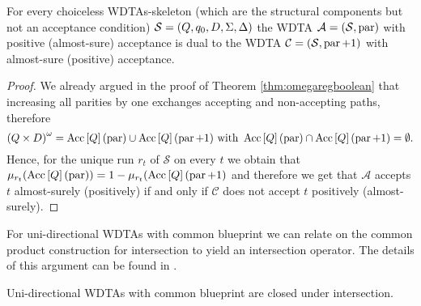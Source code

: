 \begin{proposition}
  For every choiceless \acp{WDTA}-skeleton (which are the structural components
  but not an acceptance condition) 
  $\mathcal{S} = \left(Q, q_{0}, D, \Sigma, \Delta\right)$ the
  \ac{WDTA} $\mathcal{A} = \left(\mathcal{S}, \operatorname{par}\right)$ with positive 
  (almost-sure) acceptance is dual to the \ac{WDTA} 
  $\mathcal{C} = \left(\mathcal{S}, \operatorname{par} + 1\right)$ with almost-sure (positive)
  acceptance.
\end{proposition}
\begin{proof}
  We already argued in the proof of Theorem \ref{thm:omegaregboolean} that 
  increasing all parities by one exchanges accepting and non-accepting paths,
  therefore
  \begin{equation*}
    \left(Q\times D\right)^{\omega} = 
      \operatorname{Acc}\left[Q\right](\operatorname{par})\cup\operatorname{Acc}\left[Q\right](\operatorname{par} + 1)
    \text{ with }
      \operatorname{Acc}\left[Q\right](\operatorname{par})\cap\operatorname{Acc}\left[Q\right](\operatorname{par} + 1) = \emptyset.
  \end{equation*}
  Hence, for the unique run $r_{t}$ of $\mathcal{S}$ on every $t$ we obtain 
  that $\mu_{r_{t}}(\operatorname{Acc}\left[Q\right](\operatorname{par})) = 
    1 - \mu_{r_{t}}(\operatorname{Acc}\left[Q\right](\operatorname{par} + 1)$ and therefore we get that
  $\mathcal{A}$ accepts $t$ almost-surely (positively) if and only if
  $\mathcal{C}$ does not accept $t$ positively (almost-surely).
\end{proof}
For uni-directional \acp{WDTA} with common blueprint we can relate on the 
common product construction for intersection to yield an intersection operator.
The details of this argument can be found in 
\cite[Proposition 14]{RandAutoInfTrees}.
\begin{proposition}
  Uni-directional \acp{WDTA} with common blueprint are closed under
  intersection.
\end{proposition}

